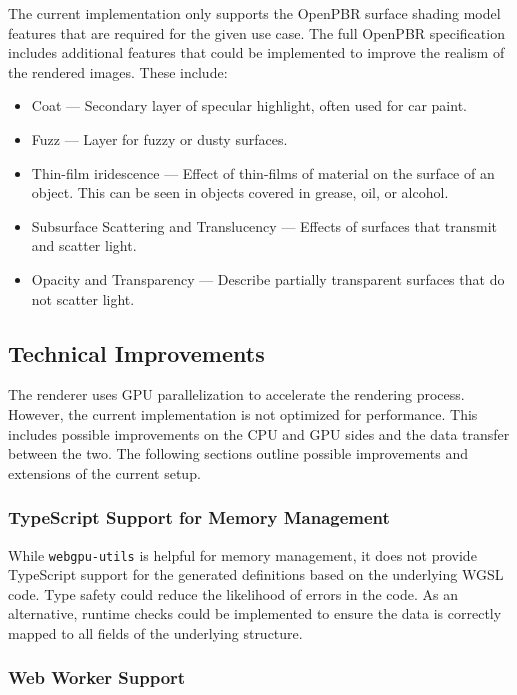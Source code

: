 The current implementation only supports the \gls{OpenPBR} surface shading model features that are required for the given use case. The full \gls{OpenPBR} specification includes additional features that could be implemented to improve the realism of the rendered images. These include:

\begin{itemize}
  \item{Coat} — Secondary layer of specular highlight, often used for car paint.
  \item{Fuzz} — Layer for fuzzy or dusty surfaces.
  \item{Thin-film iridescence} — Effect of thin-films of material on the surface of an object. This can be seen in objects covered in grease, oil, or alcohol.
  \item{Subsurface Scattering and Translucency} — Effects of surfaces that transmit and scatter light.
  \item{Opacity and Transparency} — Describe partially transparent surfaces that do not scatter light.
\end{itemize}

\subsection*{Technical Improvements}

The renderer uses \gls{GPU} parallelization to accelerate the rendering process. However, the current implementation is not optimized for performance. This includes possible improvements on the \gls{CPU} and \gls{GPU} sides and the data transfer between the two. The following sections outline possible improvements and extensions of the current setup.

\subsubsection*{TypeScript Support for Memory Management}

While \texttt{webgpu-utils} \cite{webgpuUtilsLib} is helpful for memory management, it does not provide \gls{TypeScript} support for the generated definitions based on the underlying \gls{WGSL} code. Type safety could reduce the likelihood of errors in the code. As an alternative, runtime checks could be implemented to ensure the data is correctly mapped to all fields of the underlying structure.

\subsubsection*{Web Worker Support}

